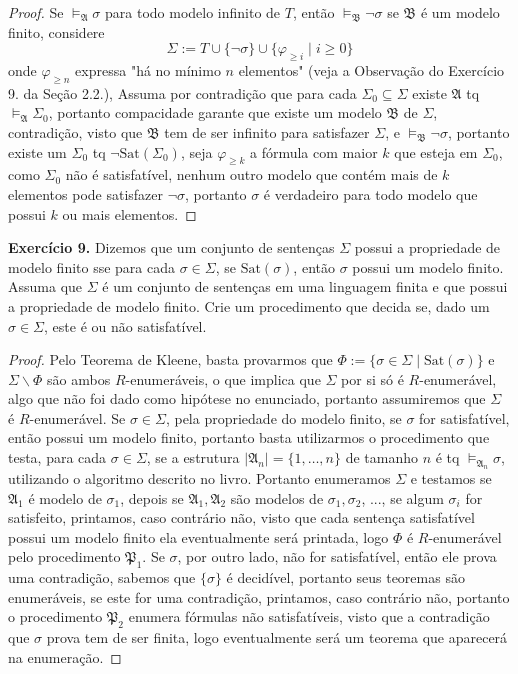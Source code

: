 \documentclass[11pt]{article}
\newcommand{\mf}[1]{\mathfrak{#1}}
\begin{document}
\begin{proof}
    Se $\vDash_\mf{A}\sigma$ para todo modelo infinito de $T$, então $\vDash_\mf{B}\neg\sigma$ se $\mf{B}$ é um modelo finito, considere
    $$\Sigma:=T\cup\{\neg\sigma\}\cup\{\varphi_{\geq i}\mid i\geq0\}$$
    onde $\varphi_{\geq n}$ expressa "há no mínimo $n$ elementos" (veja a Observação do Exercício 9. da Seção 2.2.), Assuma por contradição que para cada $\Sigma_0\subseteq\Sigma$ existe $\mf{A}$ tq $\vDash_\mf{A}\Sigma_0$, portanto compacidade garante que existe um modelo $\mf{B}$ de $\Sigma$, contradição, visto que $\mf{B}$ tem de ser infinito para satisfazer $\Sigma$, e $\vDash_\mf{B}\neg\sigma$, portanto existe um $\Sigma_0$ tq $\neg\text{Sat}(\Sigma_0)$, seja $\varphi_{\geq k}$ a fórmula com maior $k$ que esteja em $\Sigma_0$, como $\Sigma_0$ não é satisfatível, nenhum outro modelo que contém mais de $k$ elementos pode satisfazer $\neg\sigma$, portanto $\sigma$ é verdadeiro para todo modelo que possui $k$ ou mais elementos.
\end{proof}

\begin{shaded}
\textbf{Exercício 9.} Dizemos que um conjunto de sentenças $\Sigma$ possui a propriedade de modelo finito sse para cada $\sigma\in\Sigma$, se $\text{Sat}(\sigma)$, então $\sigma$ possui um modelo finito. Assuma que $\Sigma$ é um conjunto de sentenças em uma linguagem finita e que possui a propriedade de modelo finito. Crie um procedimento que decida se, dado um $\sigma\in\Sigma$, este é ou não satisfatível.
\end{shaded}

\begin{proof}
    Pelo Teorema de Kleene, basta provarmos que $\Phi:=\{\sigma\in\Sigma\mid\text{Sat}(\sigma)\}$ e $\Sigma\backslash\Phi$ são ambos $R$-enumeráveis, o que implica que $\Sigma$ por si só é $R$-enumerável, algo que não foi dado como hipótese no enunciado, portanto assumiremos que $\Sigma$ é $R$-enumerável. Se $\sigma\in\Sigma$, pela propriedade do modelo finito, se $\sigma$ for satisfatível, então possui um modelo finito, portanto basta utilizarmos o procedimento que testa, para cada $\sigma\in\Sigma$, se a estrutura $|\mf{A}_n|=\{1,\dots,n\}$ de tamanho $n$ é tq $\vDash_{\mf{A}_n}\sigma$, utilizando o algoritmo descrito no livro. Portanto enumeramos $\Sigma$ e testamos se $\mf{A}_1$ é modelo de $\sigma_1$, depois se $\mf{A}_1,\mf{A}_2$ são modelos de $\sigma_1,\sigma_2$, ..., se algum $\sigma_i$ for satisfeito, printamos, caso contrário não, visto que cada sentença satisfatível possui um modelo finito ela eventualmente será printada, logo $\Phi$ é $R$-enumerável pelo procedimento $\mf{P}_1$. Se $\sigma$, por outro lado, não for satisfatível, então ele prova uma contradição, sabemos que $\{\sigma\}$ é decidível, portanto seus teoremas são enumeráveis, se este for uma contradição, printamos, caso contrário não, portanto o procedimento $\mf{P}_2$ enumera fórmulas não satisfatíveis, visto que a contradição que $\sigma$ prova tem de ser finita, logo eventualmente será um teorema que aparecerá na enumeração.
\end{proof}
\end{document}
